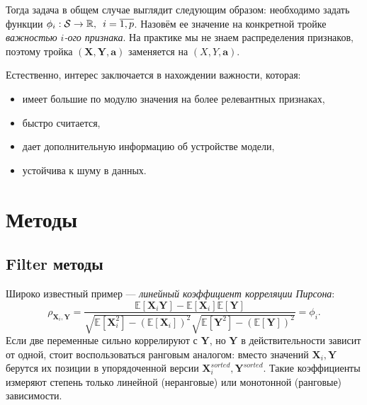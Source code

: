 \documentclass[12pt]{article}
\begin{document}
Тогда задача в общем случае выглядит следующим образом: необходимо задать функции $\phi_{i}: \mathcal{S} \to \mathbb{R}, \enspace i=\overline{1, p}$. Назовём ее значение на конкретной тройке \emph{важностью $i$-ого признака}. На практике мы не знаем распределения признаков, поэтому тройка $(\mathbf{X}, \mathbf{Y}, \mathbf{a})$ заменяется на $(X, Y, \mathbf{a})$. 

Естественно, интерес заключается в нахождении важности, которая:
\begin{itemize}[noitemsep]
    \item имеет большие по модулю значения на более релевантных признаках,
    \item быстро считается,
    \item дает дополнительную информацию об устройстве модели,
    \item устойчива к шуму в данных.
\end{itemize}

\section{Методы}
\subsection{Filter методы}
Широко известный пример --- \emph{линейный коэффициент корреляции Пирсона}:
\begin{equation*}
    \rho_{\mathbf{X}_i, \mathbf{Y}}=\frac{\mathbb{E}[\mathbf{X}_i \mathbf{Y}]-\mathbb{E}[\mathbf{X}_i] \mathbb{E}[\mathbf{Y}]}{\sqrt{\mathbb{E}\left[\mathbf{X}_i^{2}\right]-(\mathbb{E}[\mathbf{X}_i])^{2}} \sqrt{\mathbb{E}\left[\mathbf{Y}^{2}\right]-(\mathbb{E}[\mathbf{Y}])^{2}}} = \phi_{i}.
\end{equation*}
Если две переменные сильно коррелируют с $\mathbf{Y}$, но $\mathbf{Y}$ в действительности зависит от одной, стоит воспользоваться ранговым аналогом: вместо значений $\mathbf{X}_i, \mathbf{Y}$ берутся их позиции в упорядоченной версии $\mathbf{X}_{i}^{sorted}, \mathbf{Y}^{sorted}$. Такие коэффициенты измеряют степень только линейной (неранговые) или монотонной (ранговые)  зависимости.
\end{document}
